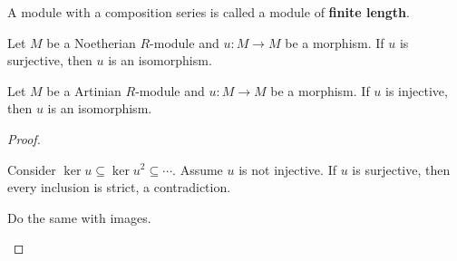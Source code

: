 \begin{defn}[3.11]
  A module with a composition series is called a module of \textbf{finite length}.
\end{defn}

\begin{prop}[3.12]
  \lv
  \begin{enum}
    \io
    Let $M$ be a Noetherian $R$-module and $u: M \to M$ be a morphism.
    If $u$ is surjective, then $u$ is an isomorphism.

    \io
    Let $M$ be a Artinian $R$-module and $u: M \to M$ be a morphism.
    If $u$ is injective, then $u$ is an isomorphism.
  \end{enum}
\end{prop}

\begin{proof}
  \lv
  \begin{enum}
    \io
    Consider $\ker u \subseteq \ker u^2 \subseteq \cdots$.
    Assume $u$ is not injective.
    If $u$ is surjective, then every inclusion is strict, a contradiction.

    \io
    Do the same with images.
    \qedhere
  \end{enum}
\end{proof}
